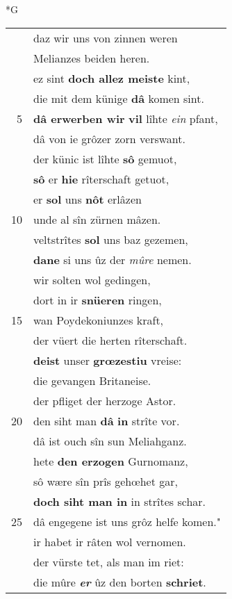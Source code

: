 \documentclass[8pt,a4paper,notitlepage]{article}
\begin{document}
\newpage
\begin{table}[ht]
\begin{minipage}[t]{0.5\linewidth}
\small
\begin{center}*G
\end{center}
\begin{tabular}{rl}
 & daz wir uns von zinnen weren\\ 
 & Melianzes beiden heren.\\ 
 & ez sint \textbf{doch allez meiste} kint,\\ 
 & die mit dem künige \textbf{dâ} komen sint.\\ 
5 & \textbf{dâ erwerben wir} \textbf{vil} lîhte \textit{ein} pfant,\\ 
 & dâ von ie grôzer zorn verswant.\\ 
 & der künic ist lîhte \textbf{sô} gemuot,\\ 
 & \textbf{sô} er \textbf{hie} rîterschaft getuot,\\ 
 & er \textbf{sol} uns \textbf{nôt} erlâzen\\ 
10 & unde al sîn zürnen mâzen.\\ 
 & veltstrîtes \textbf{sol} uns baz gezemen,\\ 
 & \textbf{dane} si uns ûz der \textit{mûre} nemen.\\ 
 & wir solten wol gedingen,\\ 
 & dort in ir \textbf{snüeren} ringen,\\ 
15 & wan Poydekoniunzes kraft,\\ 
 & der vüert die herten rîterschaft.\\ 
 & \textbf{deist} unser \textbf{grœzestiu} vreise:\\ 
 & die gevangen Britaneise.\\ 
 & der pfliget der herzoge Astor.\\ 
20 & den siht man \textbf{dâ} \textbf{in} strîte vor.\\ 
 & dâ ist ouch sîn sun Meliahganz.\\ 
 & hete \textbf{den erzogen} Gurnomanz,\\ 
 & sô wære sîn prîs gehœhet gar,\\ 
 & \textbf{doch siht man in} in strîtes schar.\\ 
25 & dâ engegene ist uns grôz helfe komen."\\ 
 & ir habet ir râten wol vernomen.\\ 
 & der vürste tet, als man im riet:\\ 
 & die mûre \textit{\textbf{er}} ûz den borten \textbf{schriet}.\\ 

\end{tabular}
\end{minipage}
\end{table}
\end{document}
